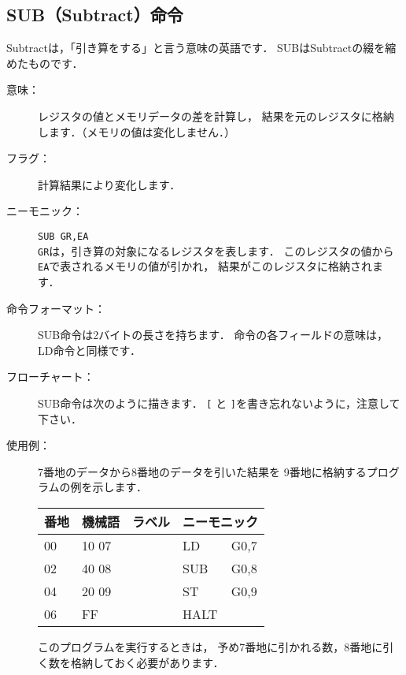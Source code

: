 \subsection{SUB（Subtract）命令}
Subtractは，「引き算をする」と言う意味の英語です．
SUBはSubtractの綴を縮めたものです．

\begin{description}
\item[意味：]レジスタの値とメモリデータの差を計算し，
結果を元のレジスタに格納します．（メモリの値は変化しません．）

\item[フラグ：]計算結果により変化します．

\item[ニーモニック：]{\tt SUB  GR,EA} \\
{\tt GR}は，引き算の対象になるレジスタを表します．
このレジスタの値から{\tt EA}で表されるメモリの値が引かれ，
結果がこのレジスタに格納されます．

\item[命令フォーマット：]SUB命令は2バイトの長さを持ちます．
命令の各フィールドの意味は，LD命令と同様です．


\item[フローチャート：]SUB命令は次のように描きます．
{\tt [} と {\tt ]}を書き忘れないように，注意して下さい．

\begin{center}
\end{center}

\item[使用例：]
7番地のデータから8番地のデータを引いた結果を
9番地に格納するプログラムの例を示します．

{\tt\small\begin{center}
\begin{tabular}{|l|l|l|l l|} \hline
番地 & 機械語 & ラベル & \multicolumn{2}{|c|}{ニーモニック} \\
\hline
00 & 10 07 & & LD   & G0,7 \\
02 & 40 08 & & SUB  & G0,8 \\
04 & 20 09 & & ST   & G0,9 \\
06 & FF    & & HALT & \\
\hline
\end{tabular}
\end{center}}

このプログラムを実行するときは，
予め7番地に引かれる数，8番地に引く数を格納しておく必要があります．
\end{description}

